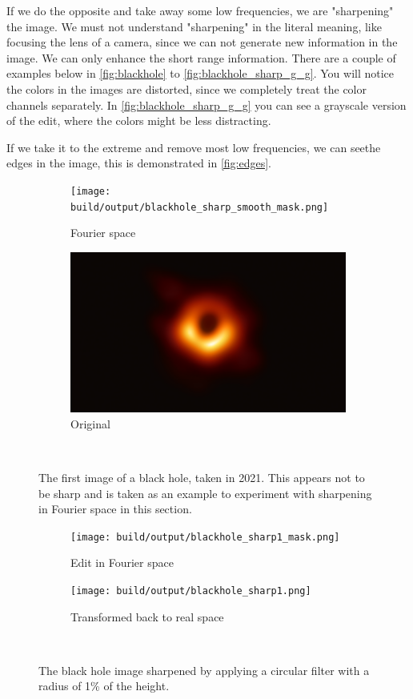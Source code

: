 \FloatBarrier

If we do the opposite and take away some low frequencies, we are "sharpening" the image.
We must not understand "sharpening" in the literal meaning, like focusing the lens of a camera,
since we can not generate new information in the image. We can only enhance the short range information.
There are a couple of examples below in \autoref{fig:blackhole} to \autoref{fig:blackhole_sharp_g_g}.
You will notice the colors in the images are distorted, since we completely treat the
color channels separately. In \autoref{fig:blackhole_sharp_g_g} you can see a grayscale version
of the edit, where the colors might be less distracting.

If we take it to the extreme and remove most low frequencies, we can seethe edges in the image, this
is demonstrated in \autoref{fig:edges}.
\begin{figure}[htbp]
    \centering
    \begin{subfigure}[h]{.49\linewidth}
        \centering
        \texttt{[image: build/output/blackhole\_sharp\_smooth\_mask.png]}
        \caption{Fourier space}
    \end{subfigure}
    \begin{subfigure}[h]{.49\linewidth}
        \centering
        \includegraphics[width=.9\linewidth]{images/blackhole.png}
        \caption{Original}
    \end{subfigure}\
    \caption{The first image of a black hole, taken in 2021.
        This appears not to be sharp and is taken as an example to experiment with sharpening in Fourier space in this section. }
    \label{fig:blackhole}
\end{figure}
\begin{figure}[htbp]
    \centering
    \begin{subfigure}[h]{.49\linewidth}
        \centering
        \texttt{[image: build/output/blackhole\_sharp1\_mask.png]}
        \caption{Edit in Fourier space}
    \end{subfigure}
    \begin{subfigure}[h]{.49\linewidth}
        \centering
        \texttt{[image: build/output/blackhole\_sharp1.png]}
        \caption{Transformed back to real space}
    \end{subfigure}\
    \caption{The black hole image sharpened by applying a circular filter with a radius of 1\% of the height.}
    \label{fig:blackhole_sharp}
\end{figure}
